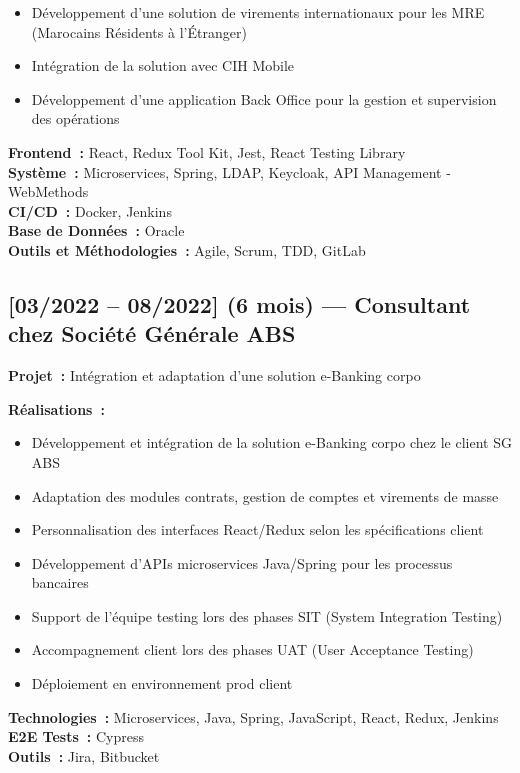 \begin{itemize}
    \item Développement d'une solution de virements internationaux pour les MRE (Marocains Résidents à l'Étranger)
    \item Intégration de la solution avec CIH Mobile
    \item Développement d'une application Back Office pour la gestion et supervision des opérations
\end{itemize}

\textbf{Frontend~:} React, Redux Tool Kit, Jest, React Testing Library\\
\textbf{Système~:} Microservices, Spring, LDAP, Keycloak, API Management - WebMethods\\
\textbf{CI/CD~:} Docker, Jenkins\\
\textbf{Base de Données~:} Oracle\\
\textbf{Outils et Méthodologies~:} Agile, Scrum, TDD, GitLab

\subsection*{[03/2022 -- 08/2022] (6 mois) --- Consultant chez Société Générale ABS}
\textbf{Projet~:} Intégration et adaptation d'une solution e-Banking corpo

\textbf{Réalisations~:}
\begin{itemize}
    \item Développement et intégration de la solution e-Banking corpo chez le client SG ABS
    \item Adaptation des modules contrats, gestion de comptes et virements de masse
    \item Personnalisation des interfaces React/Redux selon les spécifications client
    \item Développement d'APIs microservices Java/Spring pour les processus bancaires
    \item Support de l'équipe testing lors des phases SIT (System Integration Testing)
    \item Accompagnement client lors des phases UAT (User Acceptance Testing)
    \item Déploiement en environnement prod client
\end{itemize}
\textbf{Technologies~:} Microservices, Java, Spring, JavaScript, React, Redux, Jenkins\\
\textbf{E2E Tests~:} Cypress\\
\textbf{Outils~:} Jira, Bitbucket

